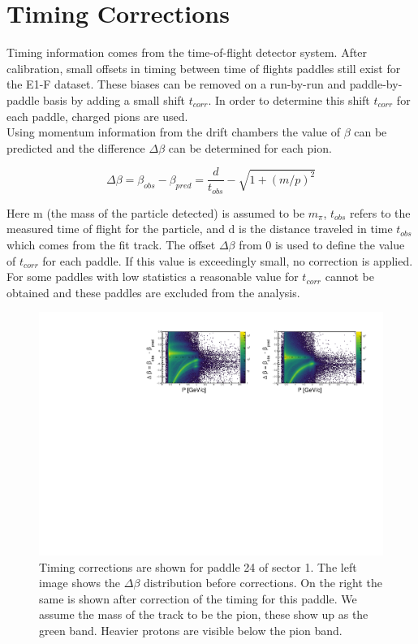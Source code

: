 \section{Timing Corrections}
Timing information comes from the time-of-flight detector system.  After calibration, small offsets in timing between time of flights paddles still exist for the E1-F dataset.  These biases can be removed on a run-by-run and paddle-by-paddle basis by adding a small shift $t_{corr}$.  In order to determine this shift $t_{corr}$ for each paddle, charged pions are used.  \\

Using momentum information from the drift chambers the value of $\beta$ can be predicted and the difference $\Delta \beta$ can be determined for each pion. 

\begin{equation}
	\Delta \beta = \beta_{obs} - \beta_{pred} = \frac{d}{t_{obs}} - \sqrt{1+(m/p)^2} 
\end{equation} 

Here m (the mass of the particle detected) is assumed to be $m_{\pi}$, $t_{obs}$ refers to the measured time of flight for the particle, and d is the distance traveled in time $t_{obs}$ which comes from the fit track.  The offset $\Delta \beta$ from 0 is used to define the value of $t_{corr}$ for each paddle.  If this value is exceedingly small, no correction is applied.  For some paddles with low statistics a reasonable value for $t_{corr}$ cannot be obtained and these paddles are excluded from the analysis.  \\

\begin{figure}
	\label{fig:timing_correction}
	\centering
	\includegraphics[width=14cm]{image/plots/basic-analysis/timing.pdf}
	\caption{Timing corrections are shown for paddle 24 of sector 1.  The left image shows the $\Delta \beta$ distribution before corrections.  On the right the same is shown after correction of the timing for this paddle.  We assume the mass of the track to be the pion, these show up as the green band.  Heavier protons are visible below the pion band.}
\end{figure}

